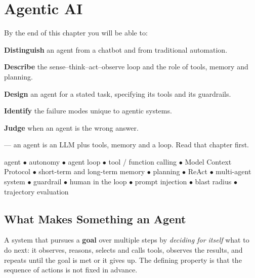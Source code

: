 \chapter{Agentic AI}\label{ch:agentic}

\begin{outcomes}
By the end of this chapter you will be able to:
\begin{tight}
  \item \textbf{Distinguish} an agent from a chatbot and from traditional automation.
  \item \textbf{Describe} the sense--think--act--observe loop and the role of tools, memory and planning.
  \item \textbf{Design} an agent for a stated task, specifying its tools and its guardrails.
  \item \textbf{Identify} the failure modes unique to agentic systems.
  \item \textbf{Judge} when an agent is the wrong answer.
\end{tight}
\end{outcomes}

\begin{prereq}
 --- an agent is an LLM plus tools, memory and a loop. Read that
chapter first.
\end{prereq}

\begin{keyterms}
agent $\bullet$ autonomy $\bullet$ agent loop $\bullet$ tool / function calling
$\bullet$ Model Context Protocol $\bullet$ short-term and long-term memory
$\bullet$ planning $\bullet$ ReAct $\bullet$ multi-agent system $\bullet$ guardrail
$\bullet$ human in the loop $\bullet$ prompt injection $\bullet$ blast radius
$\bullet$ trajectory evaluation
\end{keyterms}

\section{What Makes Something an Agent}

\begin{definitionbox}[AI Agent]
A system that pursues a \textbf{goal} over multiple steps by \emph{deciding for
itself} what to do next: it observes, reasons, selects and calls tools, observes the
results, and repeats until the goal is met or it gives up. The defining property is
that the sequence of actions is not fixed in advance.
\end{definitionbox}

